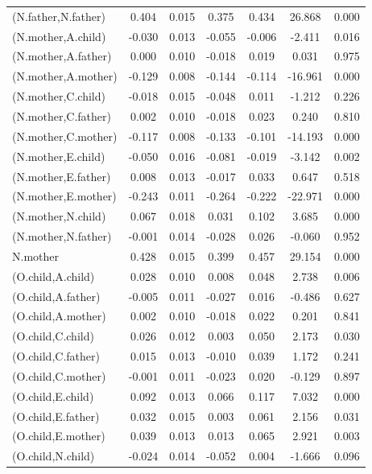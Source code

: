 \documentclass[11pt,a5paper,twoside]{book}
\begin{document}
{{\begin{center}
\begin{longtable}{@{\extracolsep{\fill}}lcccccc@{}}
   (N.father,N.father)  & 0.404 & 0.015 & 0.375 & 0.434 & 26.868 & 0.000 \\ 
   (N.mother,A.child)  & -0.030 & 0.013 & -0.055 & -0.006 & -2.411 & 0.016 \\ 
   (N.mother,A.father)  & 0.000 & 0.010 & -0.018 & 0.019 & 0.031 & 0.975 \\ 
   (N.mother,A.mother)  & -0.129 & 0.008 & -0.144 & -0.114 & -16.961 & 0.000 \\ 
   (N.mother,C.child)  & -0.018 & 0.015 & -0.048 & 0.011 & -1.212 & 0.226 \\ 
   (N.mother,C.father)  & 0.002 & 0.010 & -0.018 & 0.023 & 0.240 & 0.810 \\ 
  (N.mother,C.mother)  & -0.117 & 0.008 & -0.133 & -0.101 & -14.193 & 0.000 \\ 
   (N.mother,E.child)  & -0.050 & 0.016 & -0.081 & -0.019 & -3.142 & 0.002 \\ 
   (N.mother,E.father)  & 0.008 & 0.013 & -0.017 & 0.033 & 0.647 & 0.518 \\ 
   (N.mother,E.mother)  & -0.243 & 0.011 & -0.264 & -0.222 & -22.971 & 0.000 \\ 
   (N.mother,N.child)  & 0.067 & 0.018 & 0.031 & 0.102 & 3.685 & 0.000 \\ 
   (N.mother,N.father)  & -0.001 & 0.014 & -0.028 & 0.026 & -0.060 & 0.952 \\ 
   N.mother  & 0.428 & 0.015 & 0.399 & 0.457 & 29.154 & 0.000 \\ 
   (O.child,A.child)  & 0.028 & 0.010 & 0.008 & 0.048 & 2.738 & 0.006 \\ 
   (O.child,A.father)  & -0.005 & 0.011 & -0.027 & 0.016 & -0.486 & 0.627 \\ 
   (O.child,A.mother)  & 0.002 & 0.010 & -0.018 & 0.022 & 0.201 & 0.841 \\ 
   (O.child,C.child)  & 0.026 & 0.012 & 0.003 & 0.050 & 2.173 & 0.030 \\ 
   (O.child,C.father)  & 0.015 & 0.013 & -0.010 & 0.039 & 1.172 & 0.241 \\ 
   (O.child,C.mother)  & -0.001 & 0.011 & -0.023 & 0.020 & -0.129 & 0.897 \\ 
   (O.child,E.child)  & 0.092 & 0.013 & 0.066 & 0.117 & 7.032 & 0.000 \\ 
   (O.child,E.father)  & 0.032 & 0.015 & 0.003 & 0.061 & 2.156 & 0.031 \\ 
   (O.child,E.mother)  & 0.039 & 0.013 & 0.013 & 0.065 & 2.921 & 0.003 \\ 
   (O.child,N.child)  & -0.024 & 0.014 & -0.052 & 0.004 & -1.666 & 0.096 \\ 

\end{longtable}
\end{center}}}
\end{document}

